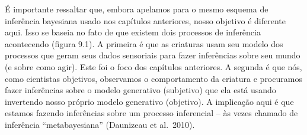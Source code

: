 \documentclass[
  12pt,
]{book}
\begin{document}
É importante ressaltar que, embora apelamos para o mesmo esquema de inferência bayesiana usado nos capítulos anteriores, nosso objetivo é diferente aqui. Isso se baseia no fato de que existem dois processos de inferência acontecendo (figura 9.1). A primeira é que as criaturas usam seu modelo dos processos que geram seus dados sensoriais para fazer inferências sobre seu mundo (e sobre como agir). Este foi o foco dos capítulos anteriores. A segunda é que nós, como cientistas objetivos, observamos o comportamento da criatura e procuramos fazer inferências sobre o modelo generativo (subjetivo) que ela está usando invertendo nosso próprio modelo generativo (objetivo). A implicação aqui é que estamos fazendo inferências sobre um processo inferencial -- às vezes chamado de inferência ``metabayesiana'' (Daunizeau et al.~2010).
\end{document}
